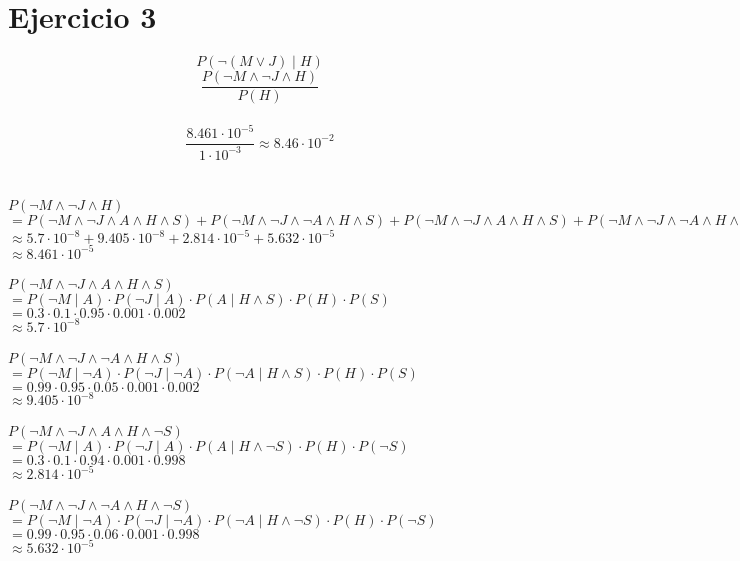 \documentclass {article}
\begin{document}
\section {Ejercicio 3}
$$P ( \neg(M \lor J) \mid H)$$
$$\frac
	{P (\neg M \land \neg J \land H)}
	{P(H)}$$\\
$$\frac
	{8.461 \cdot 10^{-5}}
	{1\cdot 10^{-3}}
	\approx 8.46 \cdot 10^{-2}$$\\
\\
$P (\neg M \land \neg J \land H) $\\
	\indent $ 
		= P (\neg M \land \neg J \land A \land H \land S)
		+ P (\neg M \land \neg J \land \neg A \land H \land S) 
		+ P (\neg M \land \neg J \land A \land H \land S) 
		+ P (\neg M \land \neg J \land \neg A \land H \land S)$\\
	\indent $
		\approx 5.7 \cdot 10^{-8} 
		+ 9.405 \cdot 10^{-8} 
		+ 2.814 \cdot 10^{-5} 
		+ 5.632 \cdot 10^{-5}$\\
	\indent $ 
		\approx 8.461 \cdot 10^{-5}$\\
\\
$P (\neg M \land \neg J \land A \land H \land S)$\\
	\indent $ 
		= P(\neg M \mid A) 
		\cdot P (\neg J \mid A) 
		\cdot P (A \mid H \land S) 
		\cdot P (H) 
		\cdot P (S) $\\
	\indent $ 
		= 0.3 
		\cdot 0.1 
		\cdot 0.95 
		\cdot 0.001 
		\cdot 0.002$\\
	\indent $
		\approx 5.7 \cdot 10^{-8}$\\
\\
$P (\neg M \land \neg J \land \neg A \land H \land S)$\\
	\indent $ 
		= P(\neg M \mid \neg A) 
		\cdot P (\neg J \mid \neg A) 
		\cdot P (\neg A \mid H \land S) 
		\cdot P (H) 
		\cdot P (S) $\\
	\indent $ 
		= 0.99 
		\cdot 0.95
		\cdot 0.05
		\cdot 0.001
		\cdot 0.002$\\
	\indent $ \approx 9.405 \cdot 10^{-8}$\\
\\
$P (\neg M \land \neg J \land A \land H \land \neg S)$\\
	\indent $ 
		= P(\neg M \mid A) 
		\cdot P (\neg J \mid A) 
		\cdot P (A \mid H \land \neg S) 
		\cdot P (H) 
		\cdot P (\neg S) $\\
	\indent $ 
		= 0.3 
		\cdot 0.1 
		\cdot 0.94 
		\cdot 0.001 
		\cdot 0.998$\\
	\indent $ \approx 2.814 \cdot 10^{-5} $\\
\\
$P (\neg M \land \neg J \land \neg A \land H \land \neg S)$\\
	\indent $ 
		= P(\neg M \mid \neg A) 
		\cdot P (\neg J \mid \neg A) 
		\cdot P (\neg A \mid H \land \neg S) 
		\cdot P (H) 
		\cdot P (\neg S) $\\
	\indent $ 
		= 0.99 
		\cdot 0.95
		\cdot 0.06
		\cdot 0.001 
		\cdot 0.998$\\
	\indent $ 
		\approx 5.632 \cdot 10^{-5}$\\
\end{document}

